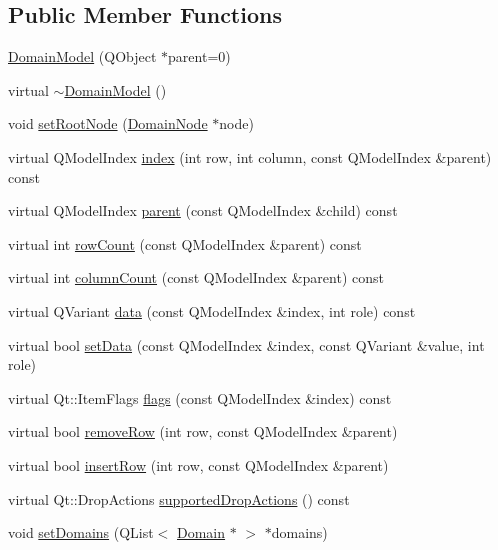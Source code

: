 \subsection*{Public Member Functions}
\begin{DoxyCompactItemize}
\item 
\hyperlink{class_domain_model_a7cdc9785bda6c89d0b87b46bfe38eb3d}{DomainModel} (QObject $\ast$parent=0)
\item 
virtual \hyperlink{class_domain_model_a74b790954bc7d7c0cb8cb86cdc60cd26}{$\sim$DomainModel} ()
\item 
void \hyperlink{class_domain_model_aa39aa4b344dce747e660a1bba95099a4}{setRootNode} (\hyperlink{class_domain_node}{DomainNode} $\ast$node)
\item 
virtual QModelIndex \hyperlink{class_domain_model_a5a39bde573e8a23cb2dcb94f16699b81}{index} (int row, int column, const QModelIndex \&parent) const 
\item 
virtual QModelIndex \hyperlink{class_domain_model_a1a57deb8cd241f680ecade666ebbe20c}{parent} (const QModelIndex \&child) const 
\item 
virtual int \hyperlink{class_domain_model_a53676872f60898f328f17d14c5fd72e2}{rowCount} (const QModelIndex \&parent) const 
\item 
virtual int \hyperlink{class_domain_model_a857745f2da0e7224824fa24df98abbd8}{columnCount} (const QModelIndex \&parent) const 
\item 
virtual QVariant \hyperlink{class_domain_model_a0532aa6f89fadb924ed0263ee919282a}{data} (const QModelIndex \&index, int role) const 
\item 
virtual bool \hyperlink{class_domain_model_ae4b94474d3778775b1373e2774a602f4}{setData} (const QModelIndex \&index, const QVariant \&value, int role)
\item 
virtual Qt::ItemFlags \hyperlink{class_domain_model_a382e0c2e1e2d606f9569448c37a129f1}{flags} (const QModelIndex \&index) const 
\item 
virtual bool \hyperlink{class_domain_model_ab2bff6186333360d66aaf9f959deb663}{removeRow} (int row, const QModelIndex \&parent)
\item 
virtual bool \hyperlink{class_domain_model_a31776f23bc9e6d430ab4655caedf7ad6}{insertRow} (int row, const QModelIndex \&parent)
\item 
virtual Qt::DropActions \hyperlink{class_domain_model_a8fbc70443f3a4452e5d4abb045d79517}{supportedDropActions} () const 
\item 
void \hyperlink{class_domain_model_a777f957e272990846fe488a3761ed436}{setDomains} (QList$<$ \hyperlink{class_domain}{Domain} $\ast$ $>$ $\ast$domains)

\end{DoxyCompactItemize}
